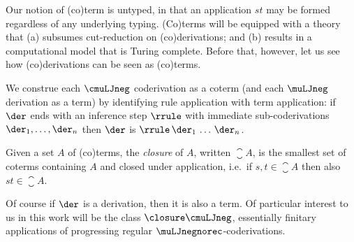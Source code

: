 Our notion of (co)term is untyped, in that an application $st$ may be formed regardless of any underlying typing. 
(Co)terms will be equipped with a theory that (a) subsumes cut-reduction on (co)derivations; and (b) results in a computational model that is Turing complete.
Before that, however, let us see how (co)derivations can be seen as (co)terms.

\begin{definition}
    We construe each $\cmuLJneg$ coderivation as a coterm (and each $\muLJneg$ derivation as a term) by identifying rule application with term application:
        if $\der$ ends with an inference step $\rrule$ with immediate sub-coderivations $\der_1 , \dots, \der_n$ 
        then $\der$ is $\rrule\, \der_1\, \dots \, \der_n$.
    
    Given a set $A$ of (co)terms, the \emph{closure} of $A$, written $\closure A$, is the smallest set of coterms containing $A$ and closed under application, i.e.\ if $s,t \in \closure A$ then also $st \in \closure A$.
\end{definition}

Of course if $\der$ is a derivation, then it is also a term.
Of particular interest to us in this work will be the class $\closure \cmuLJneg$, essentially finitary applications of progressing regular $\muLJnegnorec$-coderivations.


